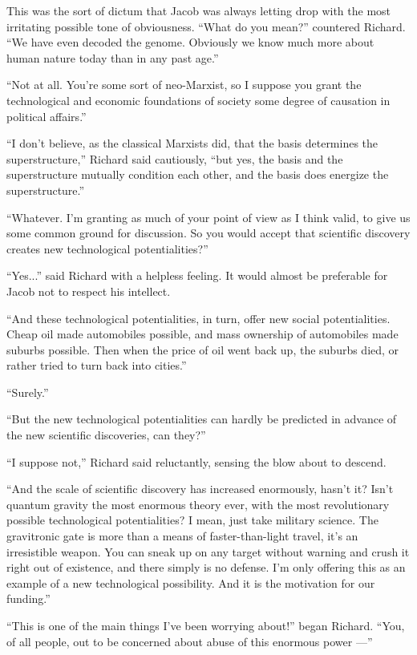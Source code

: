 \documentclass[english,11pt,letterpaper,onecolumn]{scrbook}
\begin{document}
	This was the sort of dictum that Jacob was always letting drop with the most irritating possible tone of obviousness.  ``What do you mean?'' countered Richard.  ``We have even decoded the genome.  Obviously we know much more about human nature today than in any past age.''

	``Not at all.  You're some sort of neo-Marxist, so I suppose you grant the technological and economic foundations of society some degree of causation in political affairs.''

	``I don't believe, as the classical Marxists did, that the basis determines the superstructure,'' Richard said cautiously, ``but yes, the basis and the superstructure mutually condition each other, and the basis does energize the superstructure.''

	``Whatever.  I'm granting as much of your point of view as I think valid, to give us some common ground for discussion.  So you would accept that scientific discovery creates new technological potentialities?''

	``Yes...'' said Richard with a helpless feeling.  It would almost be preferable for Jacob not to respect his intellect.

	``And these technological potentialities, in turn, offer new social potentialities.  Cheap oil made automobiles possible, and mass ownership of automobiles made suburbs possible.  Then when the price of oil went back up, the suburbs died, or rather tried to turn back into cities.''

	``Surely.''

	``But the new technological potentialities can hardly be predicted in advance of the new scientific discoveries, can they?''

	``I suppose not,'' Richard said reluctantly, sensing the blow about to descend.

	``And the scale of scientific discovery has increased enormously, hasn't it?  Isn't quantum gravity the most enormous theory ever, with the most revolutionary possible technological potentialities?  I mean, just take military science.  The gravitronic gate is more than a means of faster-than-light travel, it's an irresistible weapon.  You can sneak up on any target without warning and crush it right out of existence, and there simply is no defense.  I'm only offering this as an example of a new technological possibility.  And it is the motivation for our funding.''

	``This is one of the main things I've been worrying about!'' began Richard.  ``You, of all people, out to be concerned about abuse of this enormous power ---''
\end{document}
